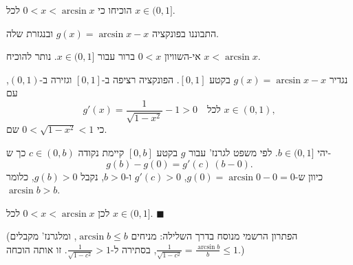 
\begin{question}
הוכיחו כי $0<x<\arcsin x$ לכל $x\in(0,1]$.
\end{question}

\begin{hint}
התבוננו בפונקציה $g(x)=\arcsin x-x$ ובנגזרת שלה.
\end{hint}

\begin{solution}
אי-השוויון $0<x$ ברור עבור $x\in(0,1]$. נותר להוכיח $x<\arcsin x$.

נגדיר $g(x)=\arcsin x-x$ בקטע $[0,1]$. הפונקציה רציפה ב-$[0,1]$ וגזירה ב-$(0,1)$, עם
\[ g'(x)=\frac{1}{\sqrt{1-x^2}}-1>0 \quad\text{לכל } x\in(0,1), \]
כי $0<\sqrt{1-x^2}<1$ שם.

יהי $b\in(0,1]$. לפי משפט לגרנז' עבור $g$ בקטע $[0,b]$ קיימת נקודה $c\in(0,b)$ כך ש-
\[ g(b)-g(0)=g'(c)\,(b-0). \]
כיוון ש-$g(0)=\arcsin0-0=0$, $g'(c)>0$ ו-$b>0$, נקבל $g(b)>0$, כלומר $\arcsin b>b$.

לכן $0<x<\arcsin x$ לכל $x\in(0,1]$. $\blacksquare$

(הפתרון הרשמי מנוסח בדרך השלילה: מניחים $\arcsin b\le b$, ומלגרנז' מקבלים $\frac{1}{\sqrt{1-c^2}}=\frac{\arcsin b}{b}\le1$, בסתירה ל-$\frac{1}{\sqrt{1-c^2}}>1$. זו אותה הוכחה.)
\end{solution}
